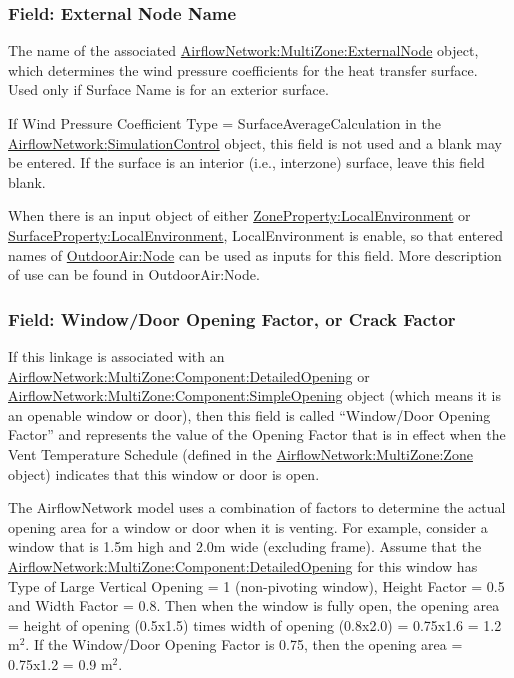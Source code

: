\subsubsection{Field: External Node Name}\label{field-external-node-name}

The name of the associated \hyperref[airflownetworkmultizoneexternalnode]{AirflowNetwork:MultiZone:ExternalNode} object, which
determines the wind pressure coefficients for the heat transfer surface. Used
only if Surface Name is for an exterior surface.

If Wind Pressure Coefficient Type = SurfaceAverageCalculation in the \hyperref[airflownetworksimulationcontrol]{AirflowNetwork:\hyperref[simulationcontrol]{SimulationControl}}
object, this field is not used and a blank may be entered. If the surface is an
interior (i.e., interzone) surface, leave this field blank.

When there is an input object of either \hyperref[ZonePropertylocalEnvironment]{ZoneProperty:LocalEnvironment} or \hyperref[surfacePropertylocalEnvironment]{SurfaceProperty:LocalEnvironment}, LocalEnvironment is enable, so that entered names of \hyperref[outdoorairnode]{OutdoorAir:Node} can be used as inputs for this field. More description of use can be found in  OutdoorAir:Node.

\subsubsection{Field: Window/Door Opening Factor, or Crack Factor}\label{field-windowdoor-opening-factor-or-crack-factor}

If this linkage is associated with an \hyperref[airflownetworkmultizonecomponentdetailedopening]{AirflowNetwork:MultiZone:Component:DetailedOpening} or \hyperref[airflownetworkmultizonecomponentsimpleopening]{AirflowNetwork:MultiZone:Component:SimpleOpening} object (which means it is an openable window or door), then this field is called ``Window/Door Opening Factor'' and represents the value of the Opening Factor that is in effect when the Vent Temperature Schedule (defined in the \hyperref[airflownetworkmultizonezone]{AirflowNetwork:MultiZone:Zone} object) indicates that this window or door is open.

The AirflowNetwork model uses a combination of factors to determine the actual opening area for a window or door when it is venting. For example, consider a window that is 1.5m high and 2.0m wide (excluding frame). Assume that the \hyperref[airflownetworkmultizonecomponentdetailedopening]{AirflowNetwork:MultiZone:Component:DetailedOpening} for this window has Type of Large Vertical Opening = 1 (non-pivoting window), Height Factor = 0.5 and Width Factor = 0.8. Then when the window is fully open, the opening area = height of opening (0.5x1.5) times width of opening (0.8x2.0) = 0.75x1.6 = 1.2 m\(^{2}\). If the Window/Door Opening Factor is 0.75, then the opening area = 0.75x1.2 = 0.9 m\(^{2}\).

